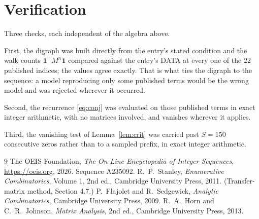 \documentclass[11pt,a4paper]{article}
\theoremstyle{plain}
\theoremstyle{definition}
\begin{document}
\section{Verification}

Three checks, each independent of the algebra above.

First, the digraph was built directly from the entry's stated condition and the walk counts
$\mathbf{1}^{\!\top}M^{n}\mathbf{1}$ compared against the entry's DATA at every one of
the $22$ published indices; the values agree exactly. That is what ties the digraph to
the sequence: a model reproducing only some published terms would be the wrong model and
was rejected wherever it occurred.

Second, the recurrence \eqref{eq:conj} was evaluated on those published terms in exact
integer arithmetic, with no matrices involved, and vanishes wherever it applies.

Third, the vanishing test of Lemma~\ref{lem:crit} was carried past $S=150$ consecutive
zeros rather than to a sampled prefix, in exact integer arithmetic.

\begin{thebibliography}{9}
 The OEIS Foundation, \emph{The On-Line Encyclopedia of Integer
Sequences}, \url{https://oeis.org}, 2026. Sequence A235092.
 R.~P.~Stanley, \emph{Enumerative Combinatorics}, Volume 1, 2nd ed.,
Cambridge University Press, 2011. (Transfer-matrix method, Section 4.7.)
 P.~Flajolet and R.~Sedgewick, \emph{Analytic Combinatorics}, Cambridge
University Press, 2009.
 R.~A.~Horn and C.~R.~Johnson, \emph{Matrix Analysis}, 2nd ed., Cambridge
University Press, 2013.
\end{thebibliography}
\end{document}
